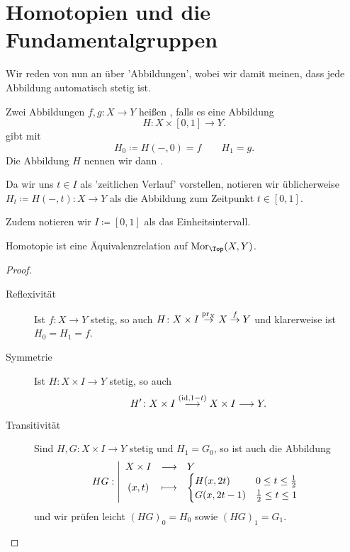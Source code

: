 

\section{Homotopien und die Fundamentalgruppen}
\begin{oral}
    Wir reden von nun an über 'Abbildungen', wobei wir damit meinen, dass jede Abbildung automatisch stetig ist.
\end{oral}

\begin{definition}[Homotopie]\label{def:homotop}
    Zwei Abbildungen $f,g\colon  X \to  Y$ heißen , falls es eine Abbildung
    \[
        H \colon  X \times [0,1] \to  Y
    .\] 
    gibt mit 
    \[
        H_0 \coloneqq  H(-,0) = f \qquad H_1 = g
    .\] 
    Die Abbildung $H$ nennen wir dann  . 
\end{definition}

\begin{dnotation}
    Da wir uns $t\in I$ als 'zeitlichen Verlauf' vorstellen, notieren wir üblicherweise $H_t \coloneqq  H(-,t)\colon  X \to  Y$ als die Abbildung zum Zeitpunkt $t\in [0,1]$. 

    Zudem notieren wir $I \coloneqq  [0,1]$ als das Einheitsintervall.
\end{dnotation}

\begin{lemma}
    Homotopie ist eine Äquivalenzrelation auf $\Mor_{\Top}(X,Y)$.
\end{lemma}
\begin{proof}
    \begin{description}
        \item[Reflexivität] Ist $f\colon  X \to  Y$ stetig, so auch  $H \colon  X \times I \stackrel{\operatorname{pr}_X}{\to } X \stackrel{f}{\to } Y $ und klarerweise ist $H_0 = H_1 = f$.
        \item[Symmetrie] Ist $H \colon  X \times I \to  Y$ stetig, so auch
            \[
                H' \colon  X \times I \stackrel{(\mathrm{id}, 1-t)}{\longrightarrow}  X\times I \longrightarrow  Y
            .\] 
        \item[Transitivität] Sind $H,G \colon  X \times I \to  Y$ stetig und $H_1 = G_0$, so ist auch die Abbildung
                \begin{equation*}
                HG: \left| \begin{array}{c c l} 
                X\times I & \longrightarrow & Y \\
                (x,t) & \longmapsto &  \begin{cases}
                    H(x,2t) & 0 \leq  t \leq  \frac{1}{2} \\
                    G(x, 2t-1) & \frac{1}{2}\leq t\leq 1
                \end{cases}
                \end{array} \right.
            \end{equation*}
            und wir prüfen leicht $(HG)_0 = H_0$ sowie $(HG)_1 = G_1$.
    \end{description}
\end{proof}

